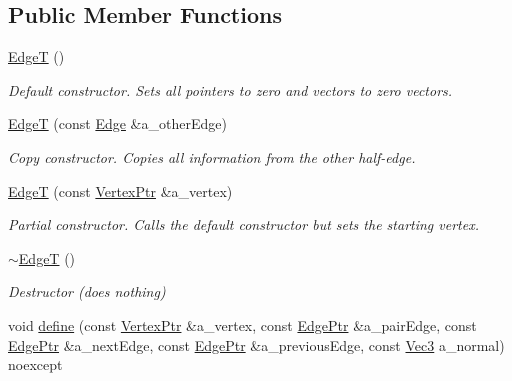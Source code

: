\subsection*{Public Member Functions}
\begin{DoxyCompactItemize}
\item 
\mbox{\label{classDcel_1_1EdgeT_a2a9682fd036374aad598a50fe54b2c1f}} 
\hyperlink{classDcel_1_1EdgeT_a2a9682fd036374aad598a50fe54b2c1f}{EdgeT} ()
\begin{DoxyCompactList}\small\item\em Default constructor. Sets all pointers to zero and vectors to zero vectors. \end{DoxyCompactList}\item 
\hyperlink{classDcel_1_1EdgeT_abe96b4404fa1961df79ffa618a7e8633}{EdgeT} (const \hyperlink{classDcel_1_1EdgeT_a00184663a9d069d2c7a7e0a970f71fd5}{Edge} \&a\+\_\+other\+Edge)
\begin{DoxyCompactList}\small\item\em Copy constructor. Copies all information from the other half-\/edge. \end{DoxyCompactList}\item 
\hyperlink{classDcel_1_1EdgeT_a639b427e60ede1948f8344a41b9bfc32}{EdgeT} (const \hyperlink{classDcel_1_1EdgeT_ab4ba57cfc6b2f90da43096eea87bb284}{Vertex\+Ptr} \&a\+\_\+vertex)
\begin{DoxyCompactList}\small\item\em Partial constructor. Calls the default constructor but sets the starting vertex. \end{DoxyCompactList}\item 
\mbox{\label{classDcel_1_1EdgeT_a94083c72ec137f822fcb08fb600ddd87}} 
\hyperlink{classDcel_1_1EdgeT_a94083c72ec137f822fcb08fb600ddd87}{$\sim$\+EdgeT} ()
\begin{DoxyCompactList}\small\item\em Destructor (does nothing) \end{DoxyCompactList}\item 
void \hyperlink{classDcel_1_1EdgeT_aa3257bd5d35041860b10e882e68b2c14}{define} (const \hyperlink{classDcel_1_1EdgeT_ab4ba57cfc6b2f90da43096eea87bb284}{Vertex\+Ptr} \&a\+\_\+vertex, const \hyperlink{classDcel_1_1EdgeT_af525f4228d820f6b8b23fc02d937e4c8}{Edge\+Ptr} \&a\+\_\+pair\+Edge, const \hyperlink{classDcel_1_1EdgeT_af525f4228d820f6b8b23fc02d937e4c8}{Edge\+Ptr} \&a\+\_\+next\+Edge, const \hyperlink{classDcel_1_1EdgeT_af525f4228d820f6b8b23fc02d937e4c8}{Edge\+Ptr} \&a\+\_\+previous\+Edge, const \hyperlink{classDcel_1_1EdgeT_a93b8679cea557c419af44385ca6d356a}{Vec3} a\+\_\+normal) noexcept

\end{DoxyCompactItemize}
